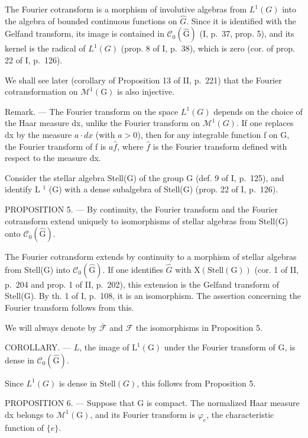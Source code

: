 The Fourier cotransform is a morphism of involutive algebras from \(L^{1}(G)\) into the algebra of bounded continuous functions on \(\widehat{G}\). Since it is identified with the Gelfand transform, its image is contained in \(\mathcal{C}_{0}(\widehat{\mathrm{G}})\) (I, p.~37, prop. 5), and its kernel is the radical of \(L^{1}(G)\) (prop. 8 of I, p.~38), which is zero (cor. of prop. 22 of I, p.~126).

We shall see later (corollary of Proposition 13 of II, p.~221) that the Fourier cotransformation on \(\mathcal{M}^{1}(\mathrm{G})\) is also injective.

Remark. --- The Fourier transform on the space \(L^{1}(G)\) depends on the choice of the Haar measure dx, unlike the Fourier transform on \(\mathcal{M}^{1}(G)\). If one replaces dx by the measure \(a \cdot dx\) (with \(a > 0\)), then for any integrable function f on G, the Fourier transform of f is \(a\widehat{f}\), where \(\widehat{f}\) is the Fourier transform defined with respect to the measure dx.

Consider the stellar algebra Stell(G) of the group G (def. 9 of I, p.~125), and identify L \(^{1}\) (G) with a dense subalgebra of Stell(G) (prop. 22 of I, p.~126).

PROPOSITION 5. --- By continuity, the Fourier transform and the Fourier cotransform extend uniquely to isomorphisms of stellar algebras from Stell(G) onto \(\mathcal{C}_{0}(\widehat{\mathrm{G}})\).

The Fourier cotransform extends by continuity to a morphism of stellar algebras from Stell(G) into \(\mathcal{C}_{0}(\widehat{\mathrm{G}})\). If one identifies \(\widehat{G}\) with \(\mathrm{X}(\mathrm{Stell}(\mathrm{G}))\) (cor. 1 of II, p.~204 and prop. 1 of II, p.~202), this extension is the Gelfand transform of Stell(G). By th. 1 of I, p.~108, it is an isomorphism. The assertion concerning the Fourier transform follows from this.

We will always denote by \(\overline{\mathcal{F}}\) and \(\mathcal{F}\) the isomorphisms in Proposition 5.

COROLLARY. --- \(L\), the image of \(\mathrm{L}^{1}(\mathrm{G})\) under the Fourier transform of G, is dense in \(\mathcal{C}_{0}(\widehat{\mathrm{G}})\).

Since \(L^{1}(G)\) is dense in \(\text{Stell}(G)\), this follows from Proposition 5.

PROPOSITION 6. — Suppose that G is compact. The normalized Haar measure dx belongs to \(\mathcal{M}^{1}(\mathrm{G})\), and its Fourier transform is \(\varphi_{e}\), the characteristic function of \(\{e\}\).

